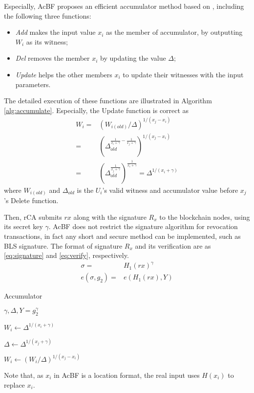 \documentclass[conference]{IEEEtran}
\begin{document}
Especially, AcBF proposes an efficient accumulator method based on \cite{accumulator}, including the following three functions:
\begin{itemize}
	\item \textit{Add} makes the input value $x_i$ as the member of accumulator, by outputting $W_i$ as its witness;
	\item \textit{Del} removes the member $x_i$ by updating the value $\Delta$;
	\item \textit{Update} helps the other members $x_i$ to update their witnesses with the input parameters.
\end{itemize}
The detailed execution of these functions are illustrated in Algorithm \ref{alg:accumulate}. Especially, the Update function is correct as 
\begin{align}
	W_i =& (W_{i(old)}/\Delta)^{1/(x_j - x_i)} \\
	= & (\Delta_{old}^{\frac{1}{x_i+\gamma} - \frac{1}{x_j+\gamma}})^{1/(x_j-x_i)} \nonumber \\
	= & (\Delta_{old}^{\frac{1}{x_j+\gamma}})^{\frac{1}{x_i+\gamma}} = \Delta^{1/(x_i+\gamma)} \nonumber
\end{align}
where $W_{i(old)}$ and $\Delta_{old}$ is the $U_i$'s valid witness and accumulator value before $x_j$'s Delete function.

Then, rCA submits $rx$ along with the signature $R_x$ to the blockchain nodes, using its secret key $\gamma$. AcBF does not restrict the signature algorithm for revocation transactions, in fact any short and secure method can be implemented, such as BLS \cite{boneh2004short} signature. The format of signature $R_x$ and its verification are as \eqref{eq:signature} and \eqref{eq:verify}, respectively.
\begin{align}
\sigma = & H_1(rx)^\gamma \label{eq:signature}\\
e(\sigma, g_2)=& e(H_1(rx), Y) \label{eq:verify}
\end{align}


\begin{algorithm}[t]
	\renewcommand{\algorithmicensure}{\textbf{Output:}}
	\caption{Accumulator}\label{alg:accumulate}
	\begin{algorithmic}[1]
		\Require $\gamma, \Delta, Y= g_2^\gamma$ %
		
		\Return $W_i \gets \Delta ^{1/(x_i + \gamma)}$
		\EndFunction
		
		
		\Return $\Delta \gets \Delta ^{1/(x_j + \gamma)}$
		\EndFunction
		 \label{fuction:update}
		
		\Return $W_i \gets (W_i/\Delta)^{1/(x_j - x_i)}$
		\EndFunction
	\end{algorithmic}
Note that, as $x_i$ in AcBF is a location format, the real input uses $H(x_i)$ to replace $x_i$. 
\end{algorithm}
\end{document}
